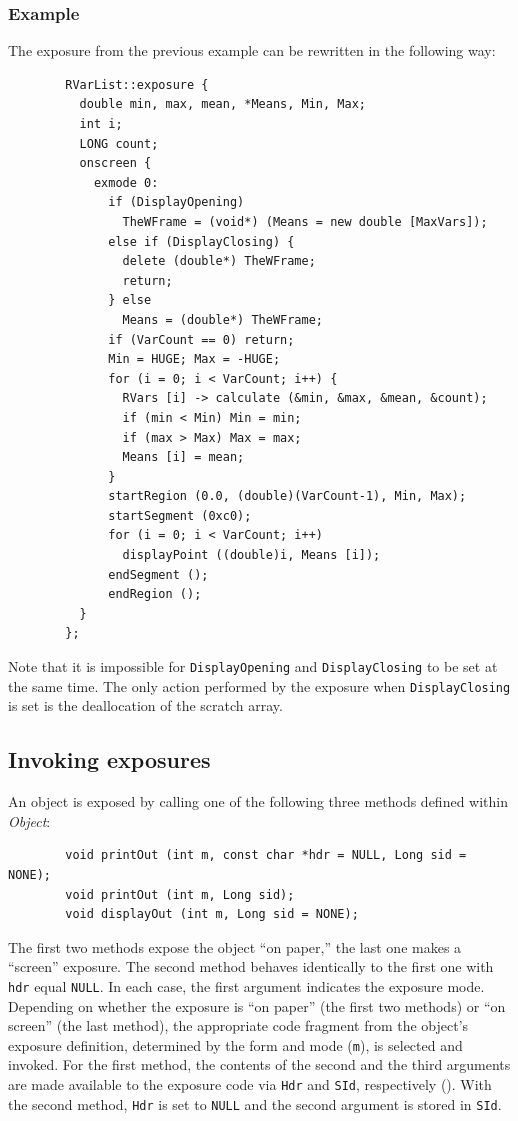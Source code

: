 \subsubsection*{Example}

\noindent
The exposure from the previous example can be rewritten in the following way:

\begin{verbatim}
        RVarList::exposure {
          double min, max, mean, *Means, Min, Max;
          int i;
          LONG count;
          onscreen {
            exmode 0:
              if (DisplayOpening)
                TheWFrame = (void*) (Means = new double [MaxVars]);
              else if (DisplayClosing) {
                delete (double*) TheWFrame;
                return;
              } else
                Means = (double*) TheWFrame;
              if (VarCount == 0) return;
              Min = HUGE; Max = -HUGE;
              for (i = 0; i < VarCount; i++) {
                RVars [i] -> calculate (&min, &max, &mean, &count);
                if (min < Min) Min = min;
                if (max > Max) Max = max;
                Means [i] = mean;
              }
              startRegion (0.0, (double)(VarCount-1), Min, Max);
              startSegment (0xc0);
              for (i = 0; i < VarCount; i++)
                displayPoint ((double)i, Means [i]);
              endSegment ();
              endRegion ();
          }
        };
\end{verbatim}

Note that it is impossible for {\tt DisplayOpening} and {\tt DisplayClosing}
to be set at the same time.
The only action performed by the exposure when {\tt DisplayClosing} is set
is the deallocation of the scratch array.

\subsection{Invoking exposures}
\label{rm_ex_in}

An object is exposed by calling one of the following three methods defined
within {\em Object\/}:
\begin{verbatim}
        void printOut (int m, const char *hdr = NULL, Long sid = NONE);
        void printOut (int m, Long sid);
        void displayOut (int m, Long sid = NONE);
\end{verbatim}

The first two methods expose the object ``on paper,'' the last one
makes a ``screen'' exposure.
The second method behaves identically to the first one with {\tt hdr}
equal {\tt NULL}.
In each case, the first argument indicates the exposure mode.
Depending on whether the exposure is ``on paper'' (the first two methods) or
``on screen'' (the last method), the appropriate code fragment from the
object's exposure definition, determined
by the form and mode ({\tt m}), is selected and invoked.
For the first method, the contents of the second and the third arguments
are made available to the exposure code via {\tt Hdr} and {\tt SId},
respectively ().
With the second method, {\tt Hdr} is set to {\tt NULL} and the second
argument is stored in {\tt SId}.

